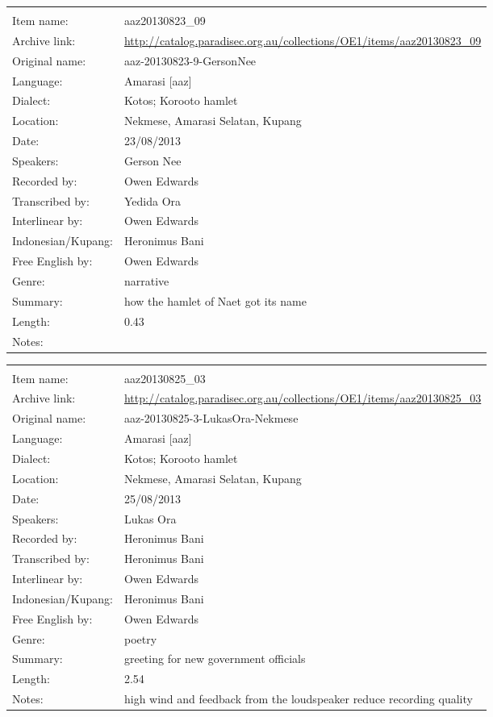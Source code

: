\newpage
\noindent
\wg\begin{tabular}{lL{.67\textwidth}}
			& \\
Item name:			& aaz20130823{\_}09\\
Archive link:			& \url{http://catalog.paradisec.org.au/collections/OE1/items/aaz20130823_09}\\
Original name:			& aaz-20130823-9-GersonNee\\
Language:				& Amarasi [aaz] \\
Dialect:				& Kotos; Koro{\Q}oto hamlet \\
Location:				& Nekmese{\Q}, Amarasi Selatan, Kupang \\
Date:				& 23/08/2013\\
Speakers:				& Gerson Nee\\
Recorded by:			& Owen Edwards\\
Transcribed by:		& Yedida Ora\\
Interlinear by:		& Owen Edwards \\
Indonesian/Kupang:		& Heronimus Bani\\
Free English by:		& Owen Edwards\\
Genre:				& narrative\\
Summary:				& how the hamlet of Naet got its name\\
Length:				& 0.43\\
Notes:				& \\
\end{tabular}

\newpage
\noindent
\wg\begin{tabular}{lL{.67\textwidth}}
			& \\
Item name:			& aaz20130825{\_}03\\
Archive link:			& \url{http://catalog.paradisec.org.au/collections/OE1/items/aaz20130825_03}\\
Original name:			& aaz-20130825-3-LukasOra-Nekmese\\
Language:				& Amarasi [aaz] \\
Dialect:				& Kotos; Koro{\Q}oto hamlet \\
Location:				& Nekmese{\Q}, Amarasi Selatan, Kupang \\
Date:				& 25/08/2013\\
Speakers:				& Lukas Ora\\
Recorded by:			& Heronimus Bani\\
Transcribed by:		& Heronimus Bani\\
Interlinear by:		& Owen Edwards \\
Indonesian/Kupang:		& Heronimus Bani\\
Free English by:		& Owen Edwards\\
Genre:				& poetry\\
Summary:				& greeting for new government officials\\
Length:				& 2.54\\
Notes:				& high wind and feedback from the loudspeaker reduce recording quality\\
\end{tabular}

